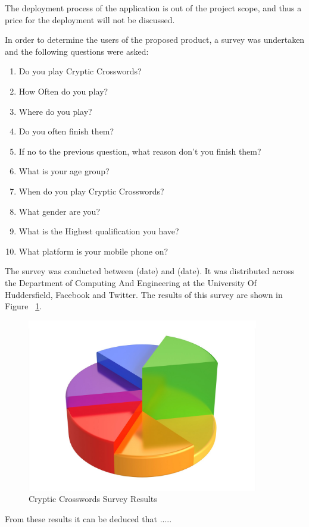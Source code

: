 The deployment process of the application is out of the project scope, and thus
a price for the deployment will not be discussed.

In order to determine the users of the proposed product, a survey was 
undertaken and the following questions were asked:

\begin{enumerate}
  \item Do you play Cryptic Crosswords?
  \item How Often do you play?
  \item Where do you play?
  \item Do you often finish them?
  \item If no to the previous question, what reason don't you finish them?
  \item What is your age group?
  \item When do you play Cryptic Crosswords?
  \item What gender are you?
  \item What is the Highest qualification you have?
  \item What platform is your mobile phone on?
\end{enumerate}

The survey was conducted between (date) and (date). It was distributed across
the Department of Computing And Engineering at the University Of Huddersfield,
Facebook and Twitter. The results of this survey are shown in Figure
~\ref{fig:survey_results}.


\begin{figure}[H]
  \includegraphics[width=0.9\textwidth]{requirements/project_drivers/survey_results.png}
  \caption{Cryptic Crosswords Survey Results}
  \label{fig:survey_results}
\end{figure}

From these results it can be deduced that .....